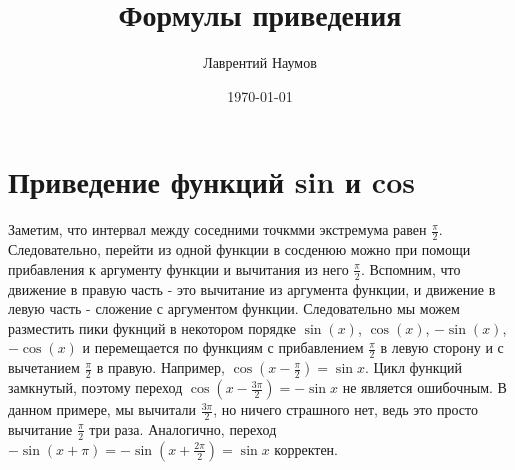\documentclass[a4paper,12pt]{article}
\author{Лаврентий Наумов}
\title{Формулы приведения}
\date{\today}
\theoremstyle{definition}
\theoremstyle{theorem}
\begin{document}
    \maketitle
    \section{Приведение функций sin и cos}
	Заметим, что интервал между соседними точкмми экстремума равен $\frac{\pi}{2}$. Следовательно, перейти из одной функции в сосденюю можно при помощи прибавления к аргументу функции и вычитания из него  $\frac{\pi}{2}$. Вспомним, что движение в правую часть - это вычитание из аргумента функции, и движение в левую часть - сложение с аргументом функции. Следовательно мы можем разместить пики фукнций в некотором порядке $\sin(x)$, $\cos(x)$, $-\sin(x)$, $-\cos(x)$ и перемещается по функциям с прибавлением $\frac{\pi}{2}$ в левую сторону и с вычетанием $\frac{\pi}{2}$  в правую. Например, $\cos(x -\frac{\pi}{2})=\sin x$. Цикл функций замкнутый, поэтому переход $\cos(x-\frac{3\pi}{2}) = -\sin x$ не является ошибочным. В данном примере, мы вычитали $\frac{3\pi}{2}$, но ничего страшного нет, ведь это просто вычитание $\frac{\pi}{2}$ три раза. Аналогично, переход $-\sin(x + \pi) = - \sin(x + \frac{2\pi}{2}) = \sin x$ корректен.
\end{document}
